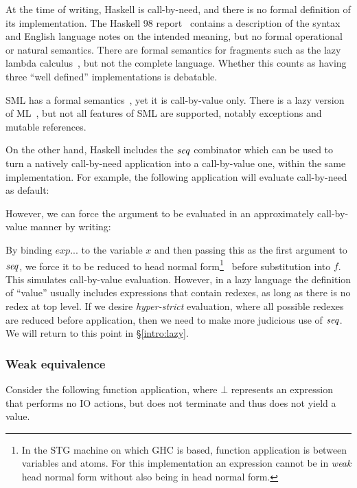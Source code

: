 At the time of writing, Haskell is call-by-need, and there is no formal definition of its implementation. The Haskell 98 report~\cite{haskell98-report} contains a description of the syntax and English language notes on the intended meaning, but no formal operational or natural semantics. There are formal semantics for fragments such as the lazy lambda calculus~\cite{aramsky:lazy-lambda-calculus, launchbury:lazy}, but not the complete language. Whether this counts as having three ``well defined'' implementations is debatable.

SML has a formal semantics~\cite{milner:sml}, yet it is call-by-value only. There is a lazy version of ML~\cite{augustsson:lml}, but not all features of SML are supported, notably exceptions and mutable references.

On the other hand, Haskell includes the $\operatorname{\mathit{seq}}$ combinator which can be used to turn a natively call-by-need application into a call-by-value one, within the same implementation. For example, the following application will evaluate call-by-need as default:


However, we can force the argument to be evaluated in an approximately call-by-value manner by writing:


By binding $exp...$ to the variable $x$ and then passing this as the first argument to $\operatorname{\mathit{seq}}$, we force it to be reduced to head normal form\footnote{In the STG machine on which GHC is based, function application is between variables and atoms. For this implementation an expression cannot be in \emph{weak} head normal form without also being in head normal form.}~\cite{peyton-jones:implementation, peyton-jones:g-machine} before substitution into $f$. This simulates call-by-value evaluation. However, in a lazy language the definition of ``value'' usually includes expressions that contain redexes, as long as there is no redex at top level. If we desire \emph{hyper-strict} evaluation, where all possible redexes are reduced before application, then we need to make more judicious use of $\operatorname{\mathit{seq}}$. We will return to this point in \S\ref{intro:lazy}.

\clearpage{}
\subsubsection{Weak equivalence}
Consider the following function application, where $\bot$ represents an expression that performs no IO actions, but does not terminate and thus does not yield a value.

